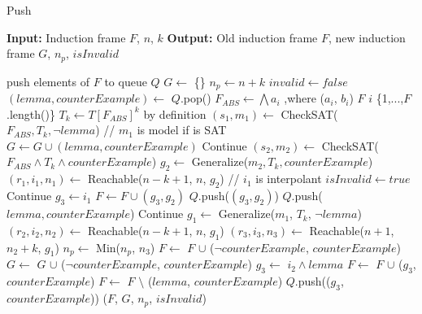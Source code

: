 \begin{algorithm}
\caption{Push}
\begin{algorithmic}[1]
\State \textbf{Input:} Induction frame $F$, $n$, $k$
\State \textbf{Output:} Old induction frame $F$, new induction frame $G$, $n_p$, $isInvalid$ 

\State push elements of $F$ to queue $Q$
    \State $G \gets$ \{\}
    \State $n_p \gets n + k$
    \State $invalid \gets false$
        \State $(lemma, counterExample)  \gets$ $Q$.pop()
        \State $F_{ABS} \gets \bigwedge a_i$ ,where ($a_i$, $b_i$) \in $F$ \forall $i$ \in \{1,...,$F$.length()\}
        \State $T_k \gets T[F_{ABS}]^k$ by definition
        \State $(s_1, m_1) \gets$ CheckSAT($F_{ABS}, T_k, \neg lemma$) // $m_1$ is model if is SAT
            \State $G \gets G \cup (lemma, counterExample)$
            \State Continue
        \EndIf
        \State $(s_2, m_2) \gets$ CheckSAT($F_{ABS} \wedge T_k \wedge counterExample$)
            \State $ g_2 \gets $ Generalize($m_2, T_k, counterExample$)
            \State $(r_1, i_1, n_1) \gets $ Reachable($n-k+1$, $n$, $g_2$) // $i_1$ is interpolant
                \State $ isInvalid \gets true $
                \State Continue
            \Else
                \State $g_3 \gets i_1$
                \State $F \gets F \cup (g_3, g_2)$
                \State $Q$.push($(g_3, g_2)$)
                \State $Q$.push($lemma, counterExample$)
                \State Continue
            \EndIf
        \EndIf
        \State $g_1 \gets$ Generalize($m_1$, $T_k$, $\neg lemma$)
        \State $(r_2, i_2, n_2) \gets $ Reachable($n-k+1$, $n$, $g_1$)
            \State $(r_3, i_3, n_3) \gets $ Reachable($n+1$, $n_2 + k$, $g_1$)
            \State $n_p \gets $ Min($n_p$, $n_3$)
            \State $F \gets$ $F$ $\cup $ ($\neg counterExample$, $counterExample$)
            \State $G \gets$ $G$ $\cup $ ($\neg counterExample$, $counterExample$)
        \Else
            \State $g_3 \gets$ $i_2 \wedge lemma$
            \State $F \gets$ $F$ $\cup $ ($g_3$, $counterExample$)
            \State $F \gets$ $F$ $\setminus $ ($lemma$, $counterExample$)
            \State $Q$.push(($g_3$, $counterExample$))
        \EndIf
        \State \Return ($F$, $G$, $n_p$, $isInvalid$)
    \EndWhile
        
\end{algorithmic}
\end{algorithm}


